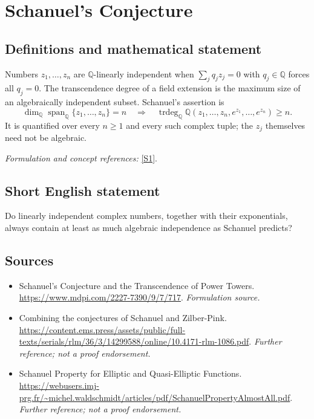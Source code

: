 \documentclass[11pt]{article}
\begin{document}
\section*{\texorpdfstring{Schanuel's Conjecture}{Schanuel's Conjecture}}\label{statement}
\subsection{Definitions and mathematical statement}
Numbers $z_1,\ldots,z_n$ are ${\mathbb{Q}}$-linearly independent when $\sum_jq_jz_j=0$ with $q_j\in{\mathbb{Q}}$ forces all $q_j=0$. The transcendence degree of a field extension is the maximum size of an algebraically independent subset. Schanuel's assertion is
\[
 \dim_{{\mathbb{Q}}}\operatorname{span}_{{\mathbb{Q}}}\{z_1,\ldots,z_n\}=n
 \quad\Longrightarrow\quad
 \operatorname{trdeg}_{{\mathbb{Q}}}{\mathbb{Q}}(z_1,\ldots,z_n,e^{z_1},\ldots,e^{z_n})\ge n.
\]
It is quantified over every $n\ge1$ and every such complex tuple; the $z_j$ themselves need not be algebraic.
\par\smallskip\textit{Formulation and concept references:} \href{https://www.mdpi.com/2227-7390/9/7/717}{[S1]}.

\subsection{Short English statement}
Do linearly independent complex numbers, together with their exponentials, always contain at least as much algebraic independence as Schanuel predicts?
\subsection{Sources}
\begin{itemize}
\item[S1]Schanuel's Conjecture and the Transcendence of Power Towers.
\url{https://www.mdpi.com/2227-7390/9/7/717}.
\textit{Formulation source.}
\item[S2]Combining the conjectures of Schanuel and Zilber-Pink.
\url{https://content.ems.press/assets/public/full-texts/serials/rlm/36/3/14299588/online/10.4171-rlm-1086.pdf}.
\textit{Further reference; not a proof endorsement.}
\item[S3]Schanuel Property for Elliptic and Quasi-Elliptic Functions.
\url{https://webusers.imj-prg.fr/~michel.waldschmidt/articles/pdf/SchanuelPropertyAlmostAll.pdf}.
\textit{Further reference; not a proof endorsement.}
\end{itemize}
\end{document}
